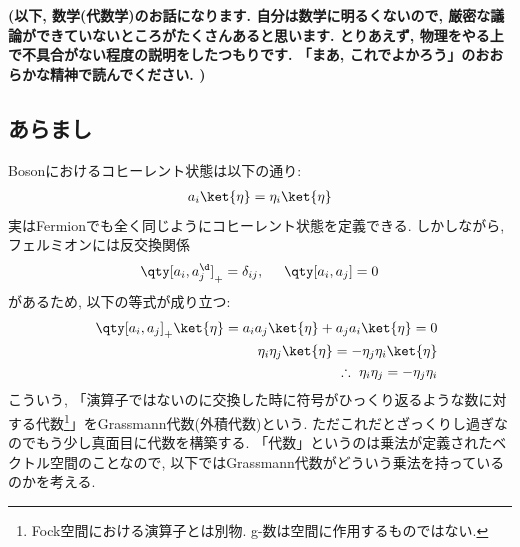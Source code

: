\documentclass[10.5pt,a4paper]{jreport}
\begin{document}
\textbf{(以下, 数学(代数学)のお話になります. 自分は数学に明るくないので, 厳密な議論ができていないところがたくさんあると思います. とりあえず, 物理をやる上で不具合がない程度の説明をしたつもりです. 「まあ, これでよかろう」のおおらかな精神で読んでください. )}
\subsection{あらまし}
Bosonにおけるコヒーレント状態は以下の通り:
\begin{eqnarray}
  a_i\ket{\eta} = \eta_i\ket{\eta}
\end{eqnarray}
実はFermionでも全く同じようにコヒーレント状態を定義できる. しかしながら, フェルミオンには反交換関係
\begin{eqnarray}
  \qty[a_i, a_j^\d]_+ = \delta_{ij},\hspace{0.5cm} \qty[a_i, a_j] = 0
\end{eqnarray}
があるため, 以下の等式が成り立つ:
\begin{eqnarray}
  &&\qty[a_i, a_j]_+\ket{\eta} = a_ia_j\ket{\eta} + a_ja_i\ket{\eta} = 0\\
  &&\eta_i\eta_j\ket{\eta} = -\eta_j\eta_i\ket{\eta}\\
  &&\therefore\ \eta_i\eta_j = -\eta_j\eta_i
\end{eqnarray}
こういう, 「演算子ではないのに交換した時に符号がひっくり返るような数に対する代数\footnote{Fock空間における演算子とは別物. g-数は空間に作用するものではない. }」をGrassmann代数(外積代数)という. ただこれだとざっくりし過ぎなのでもう少し真面目に代数を構築する. 「代数」というのは乗法が定義されたベクトル空間のことなので, 以下ではGrassmann代数がどういう乗法を持っているのかを考える. 
\end{document}
